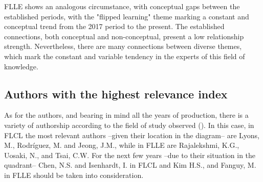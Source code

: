 \documentclass{textolivre}
\begin{document}
FLLE shows an analogous circumstance, with conceptual gaps between the established periods, with the "flipped learning" theme marking a constant and conceptual trend from the 2017 period to the present. The established connections, both conceptual and non-conceptual, present a low relationship strength. Nevertheless, there are many connections between diverse themes, which mark the constant and variable tendency in the experts of this field of knowledge.

\subsection{Authors with the highest relevance index}\label{sec-structural}
As for the authors, and bearing in mind all the years of production, there is a variety of authorship according to the field of study observed (). In this case, in FLCL the most relevant authors –given their location in the diagram– are Lyons, M., Rodríguez, M. and Jeong, J.M., while in FLLE are Rajalekshmi, K.G., Uosaki, N., and Tsai, C.W. For the next few years –due to their situation in the quadrant– Chen, N.S. and Isenhardt, I. in FLCL and Kim H.S., and Fanguy, M. in FLLE should be taken into consideration.
\end{document}
